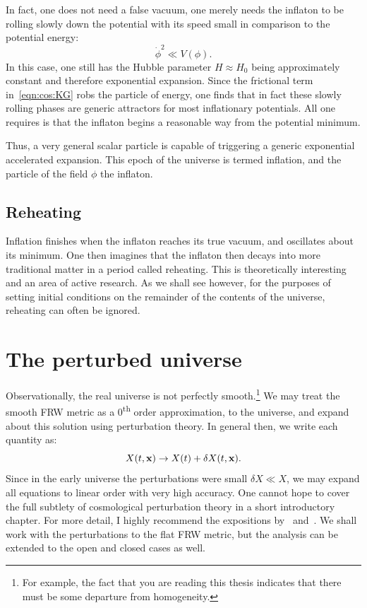 In fact, one does not need a false vacuum, one merely needs the inflaton to be rolling slowly down the potential with its speed small in comparison to the potential energy:
\begin{equation}
  \dot{\phi}^2 \ll V(\phi).
  \label{eqn:cos:slow_roll}
\end{equation}
In this case, one still has the Hubble parameter \(H\approx H_0\) being approximately constant and therefore exponential expansion. Since the frictional term in~\eqref{eqn:cos:KG} robs the particle of energy, one finds that in fact these slowly rolling phases are generic attractors for most inflationary potentials. All one requires is that the inflaton begins a reasonable way from the potential minimum.

Thus, a very general scalar particle is capable of triggering a generic exponential accelerated expansion. This epoch of the universe is termed inflation, and the particle of the field \(\phi\) the inflaton.

\subsection{Reheating}
Inflation finishes when the inflaton reaches its true vacuum, and oscillates about its minimum. One then imagines that the inflaton then decays into more traditional matter in a period called reheating. This is theoretically interesting and an area of active research. As we shall see however, for the purposes of setting initial conditions on the remainder of the contents of the universe, reheating can often be ignored.




\section{The perturbed universe}
Observationally, the real universe is not perfectly smooth.\footnote{For example, the fact that you are reading this thesis indicates that there must be some departure from homogeneity.}
We may treat the smooth FRW metric as a 0\textsuperscript{th} order approximation, to the universe, and expand about this solution using perturbation theory. In general then, we write each quantity as:
\begin{equation}
  X(t,\mathbf{x}) \rightarrow X(t) + \delta X(t,\mathbf{x}).
  \label{eqn:cos:expansion}
\end{equation}
Since in the early universe the perturbations were small \(\delta X \ll X\), we may expand all equations to linear order with very high accuracy. One cannot hope to cover the full subtlety of cosmological perturbation theory in a short introductory chapter. For more detail, I highly recommend the expositions by~\cite{mukhanov_theory_1992} and~\cite{Baumann+2009}. We shall work with the perturbations to the flat FRW metric, but the analysis can be extended to the open and closed cases as well.



